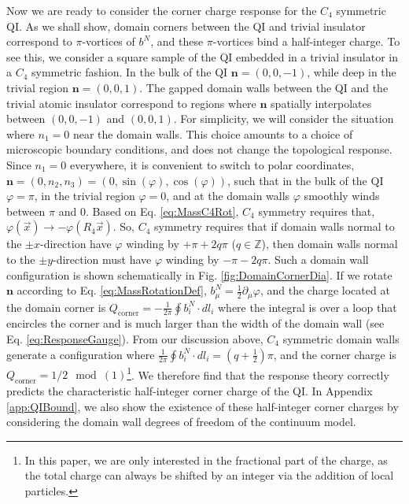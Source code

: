 \documentclass[%
 reprint,
 amsmath,amssymb,
 aps,
]{revtex4-1}
\begin{document}
Now we are ready to consider the corner charge response for the $C_4$ symmetric QI. As we shall show, domain corners between the QI and trivial insulator correspond to $\pi$-vortices of $b^N$, and these $\pi$-vortices bind a half-integer charge. To see this, we consider a square sample of the QI embedded in a trivial insulator in a $C_4$ symmetric fashion. In the bulk of the QI $\bm{n} = (0,0,-1)$, while deep in the trivial region $\bm{n} = (0,0,1)$. The gapped domain walls between the QI and the trivial atomic insulator correspond to regions where $\bm{n}$ spatially interpolates between $(0,0,-1)$ and $(0,0,1)$. For simplicity, we will consider the situation where $n_1 = 0$ near the domain walls. This choice amounts to a choice of microscopic boundary conditions, and does not change the topological response. Since $n_1 = 0$ everywhere, it is convenient to switch to polar coordinates, $\bm{n} = (0,n_2,n_3) = (0,\sin(\varphi),\cos(\varphi))$, such that in the bulk of the QI $\varphi = \pi$, in the trivial region $\varphi = 0$, and at the domain walls $\varphi$ smoothly winds between $\pi$ and $0$. Based on Eq. \ref{eq:MassC4Rot}, $C_4$ symmetry requires that, $\varphi(\vec{x}) \rightarrow -\varphi(R_4\vec{x})$. So, $C_4$ symmetry requires that if domain walls normal to the $\pm x$-direction have $\varphi$ winding by $+\pi + 2q\pi $ ($q\in \mathbb{Z}$), then domain walls normal to the $\pm y$-direction must have $\varphi$ winding by $-\pi - 2q\pi $. Such a domain wall configuration is shown schematically in Fig. \ref{fig:DomainCornerDia}. If we rotate $\bm{n}$ according to Eq. \ref{eq:MassRotationDef}, $b^N_\mu = \frac{1}{2}\partial_\mu \varphi$, and the charge located at the domain corner is $Q_{\text{corner}} = -\frac{1}{2\pi}\oint b_i^N\cdot dl_i$ where the integral is over a loop that encircles the corner and is much larger than the width of the domain wall (see Eq. \ref{eq:ResponseGauge}). From our discussion above, $C_4$ symmetric domain walls generate a configuration where $\frac{1}{2\pi}\oint b_i^N\cdot dl_i = (q+\frac{1}{2})\pi$, and the corner charge is $Q_{\text{corner}} = 1/2 \mod(1)$\footnote{In this paper, we are only interested in the fractional part of the charge, as the total charge can always be shifted by an integer via the addition of local particles.}. We therefore find that the response theory correctly predicts the characteristic half-integer corner charge of the QI. In Appendix \ref{app:QIBound}, we also show the existence of these half-integer corner charges by considering the domain wall degrees of freedom of the continuum model. 
\end{document}
